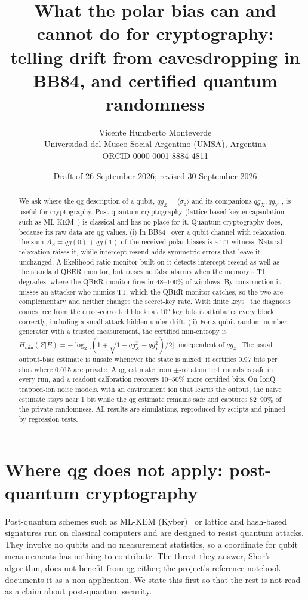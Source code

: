 \documentclass[11pt]{article}
\title{What the polar bias can and cannot do for cryptography:\\
telling drift from eavesdropping in BB84, and certified quantum randomness}
\author{Vicente Humberto Monteverde\\
\small Universidad del Museo Social Argentino (UMSA), Argentina\\
\small ORCID 0000-0001-8884-4811}
\date{\small Draft of 26 September 2026; revised 30 September 2026}
\newcommand{\qgZ}{qg_Z}
\newcommand{\qgX}{qg_X}
\newcommand{\qgY}{qg_Y}
\begin{document}
\maketitle

\begin{abstract}
We ask where the qg description of a qubit, $\qgZ=\langle\sigma_z\rangle$ and its companions
$\qgX,\qgY$~\cite{monteverde2026qang}, is useful for cryptography. Post-quantum cryptography
(lattice-based key encapsulation such as ML-KEM~\cite{fips203}) is classical and has no place for
it. Quantum cryptography does, because its raw data are qg values. (i) In BB84~\cite{bennett1984}
over a qubit channel with relaxation, the sum $A_Z=qg(0)+qg(1)$ of the received polar biases is a T1
witness. Natural relaxation raises it, while intercept-resend adds symmetric errors that leave it
unchanged. A likelihood-ratio monitor built on it detects intercept-resend as well as the standard
QBER monitor, but raises no false alarms when the memory's T1 degrades, where the QBER monitor fires in
48--100\% of windows. By construction it misses an attacker who mimics T1, which the QBER monitor
catches, so the two are complementary and neither changes the secret-key rate. With finite keys~\cite{tomamichel2012} the
diagnosis comes free from the error-corrected block: at $10^5$ key bits it attributes every block
correctly, including a small attack hidden under drift. (ii) For a qubit
random-number generator with a trusted measurement, the certified min-entropy is
$H_{\min}(Z|E)=-\log_2\big[(1+\sqrt{1-\qgX^2-\qgY^2})/2\big]$, independent of $\qgZ$. The usual
output-bias estimate is unsafe whenever the state is mixed: it certifies 0.97 bits per shot where
0.015 are private. A qg estimate from $\pm$-rotation test rounds is safe in every run, and a readout
calibration recovers 10--50\% more certified bits. On IonQ trapped-ion noise models, with an
environment ion that learns the output, the naive estimate stays near 1 bit while the qg estimate
remains safe and captures 82--90\% of the private randomness. All results are simulations, reproduced by scripts
and pinned by regression tests.
\end{abstract}

\section{Where qg does not apply: post-quantum cryptography}

Post-quantum schemes such as ML-KEM (Kyber)~\cite{fips203} or lattice and hash-based signatures run on
classical computers and are designed to resist quantum attacks. They involve no qubits and no
measurement statistics, so a coordinate for qubit measurements has nothing to contribute. The threat
they answer, Shor's algorithm, does not benefit from qg either; the project's reference notebook
documents it as a non-application. We state this first so that the rest is not read as a claim about
post-quantum security.
\end{document}
